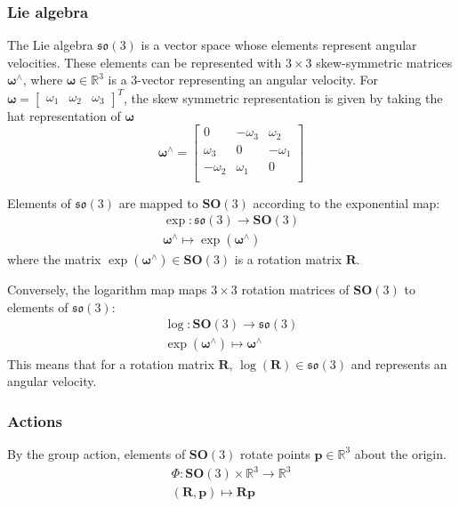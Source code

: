		\subsubsection{Lie algebra}
		The Lie algebra $\mathfrak{so}(3)$ is a vector space whose elements represent angular velocities. These elements can be represented with $3 \times 3$ skew-symmetric matrices $\bm{\omega}^{\wedge}$, where $\bm{\omega} \in \mathbb{R}^3$ is a 3-vector representing an angular velocity. For
		$\bm{\omega} = 
		\begin{bmatrix}
			\omega_1 & \omega_2 & \omega_3
		\end{bmatrix}^T$, the skew symmetric representation is given by taking the hat representation of $\bm{\omega}$
			\begin{equation}
				\bm{\omega}^{\wedge} =  
				\begin{bmatrix}
					0 			& -\omega_3 & \omega_2	\\
					\omega_3 	& 0 		& -\omega_1	\\
					-\omega_2 	& \omega_1 	& 0			\\
				\end{bmatrix}
			\end{equation}
		
		Elements of $\mathfrak{so}(3)$ are mapped to $\textbf{SO}(3)$ according to the exponential map:
		\begin{equation}
			\begin{split}
				\exp: \mathfrak{so}(3) \rightarrow \mathbf{SO}(3)\\
				\bm{\omega}^{\wedge} \mapsto \exp(\bm{\omega}^{\wedge})
			\end{split}		
		\end{equation}		
		where the matrix $\exp(\bm{\omega}^{\wedge}) \in  \mathbf{SO}(3)$ is a rotation matrix $\mathbf{R}$.
		
		Conversely, the logarithm map maps $3 \times 3$ rotation matrices of $\mathbf{SO}(3)$ to elements of $\mathfrak{so}(3)$:
		\begin{equation}
			\begin{split}
				\log: \mathbf{SO}(3) \rightarrow \mathfrak{so}(3)\\
				 \exp(\bm{\omega}^{\wedge}) \mapsto \bm{\omega}^{\wedge}
			\end{split}		
		\end{equation}		
		This means that for a rotation matrix $\mathbf{R}$, $\log(\mathbf{R}) \in \mathfrak{so}(3)$ and represents an angular velocity.
		
		\subsubsection{Actions}
		By the group action, elements of $\mathbf{SO}(3)$ rotate points $\mathbf{p} \in \mathbb{R}^3$ about the origin. 
		\begin{equation}
			\begin{split}
				\Phi: \mathbf{SO}(3) \times \mathbb{R}^3 \rightarrow \mathbb{R}^3\\
				(\mathbf{R},\mathbf{p}) \mapsto \mathbf{Rp}
			\end{split}	
		\end{equation}
		
